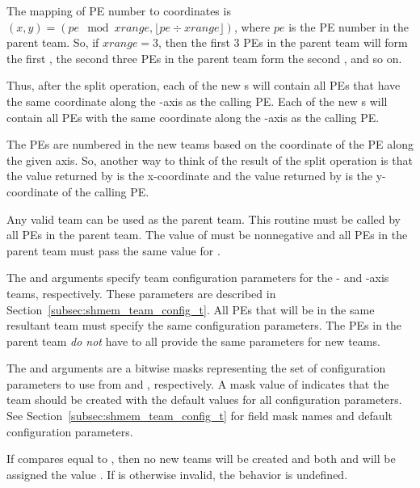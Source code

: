 \begin{apidefinition}
{The mapping of \ac{PE} number to coordinates is $(x, y) = ( pe \mod xrange, \lfloor pe \div xrange \rfloor )$,
where $pe$ is the \ac{PE} number in the parent team. So, if $xrange = 3$,
then the first 3 \acp{PE} in the parent team will form the first
, the second three \acp{PE} in the parent team form the second ,
and so on.

Thus, after the split operation, each of the new s will contain all \acp{PE} that
have the same coordinate along the -axis as the calling \ac{PE}. Each of the
new s will contain all \acp{PE} with the same coordinate along the
-axis as the calling \ac{PE}.

The \acp{PE} are numbered in the new teams based on the coordinate of the
\ac{PE} along the given axis. So, another way to think of the result of the split
operation is that the value returned by  is the
x-coordinate and the value returned by 
is the y-coordinate of the calling \ac{PE}.

Any valid \openshmem team can be used as the parent team. This routine must be
called by all \acp{PE} in the parent team. The value of  must be
nonnegative and all \acp{PE} in the parent team must pass the same value for
.

The  and  arguments specify team
configuration parameters for the - and -axis teams, respectively.
These parameters are described in Section~\ref{subsec:shmem_team_config_t}.
All \acp{PE} that will be in the same resultant team must specify the same
configuration parameters.
The \acp{PE} in the parent team \emph{do not} have to all provide the same
parameters for new teams.

The  and  arguments are a bitwise masks
representing the set of configuration parameters to use from
 and , respectively.
A mask value of  indicates that the team
should be created with the default values for all configuration parameters.
See Section~\ref{subsec:shmem_team_config_t} for field mask names and
default configuration parameters.

If  compares equal to
, then no new teams will be created
and both  and  will be assigned the
value .
If  is otherwise invalid, the behavior is undefined.

}
\end{apidefinition}
